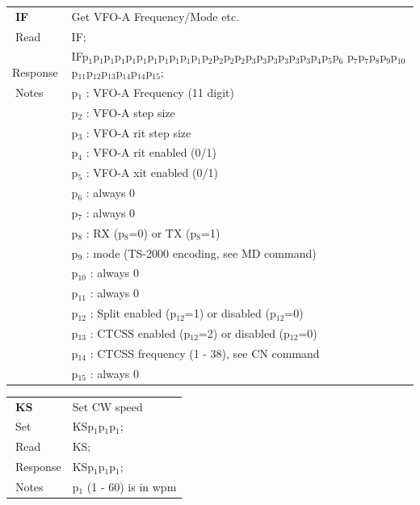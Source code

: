 \documentclass[12pt]{book}
\begin{document}
\begin{center}
\begin{tabular}{|p{2cm}|p{11cm}|}
\toprule
$\phantom{\Big|}$\textbf{\large IF} & Get VFO-A Frequency/Mode etc. \\\cline{1-2}
$\phantom{\Big|}${\large Read} & {IF;} \\\hline
$\phantom{\Big|}${\large Response} & {IFp$_1$p$_1$p$_1$p$_1$p$_1$p$_1$p$_1$p$_1$p$_1$p$_1$p$_1$p$_2$p$_2$p$_2$p$_2$p$_3$p$_3$p$_3$p$_3$p$_3$p$_3$p$_4$p$_5$p$_6$
p$_7$p$_7$p$_8$p$_9$p$_{10}$p$_{11}$p$_{12}$p$_{13}$p$_{14}$p$_{14}$p$_{15}$;} \\\hline
$\phantom{\Big|}${\large Notes} & \multicolumn{1}{|p{11cm}|}{p$_1$ : VFO-A Frequency (11 digit)} \\
 & \multicolumn{1}{|p{11cm}|}{p$_2$ : VFO-A step size} \\
 & \multicolumn{1}{|p{11cm}|}{p$_3$ : VFO-A rit step size} \\
 & \multicolumn{1}{|p{11cm}|}{p$_4$ : VFO-A rit enabled (0/1)} \\
 & \multicolumn{1}{|p{11cm}|}{p$_5$ : VFO-A xit enabled (0/1)} \\
 & \multicolumn{1}{|p{11cm}|}{p$_6$ : always 0} \\
 & \multicolumn{1}{|p{11cm}|}{p$_7$ : always 0} \\
 & \multicolumn{1}{|p{11cm}|}{p$_8$ : RX (p$_8$=0) or TX (p$_8$=1)} \\
 & \multicolumn{1}{|p{11cm}|}{p$_9$ : mode (TS-2000 encoding, see MD command)} \\
 & \multicolumn{1}{|p{11cm}|}{p$_{10}$ : always 0} \\
 & \multicolumn{1}{|p{11cm}|}{p$_{11}$ : always 0} \\
 & \multicolumn{1}{|p{11cm}|}{p$_{12}$ : Split enabled (p$_{12}$=1) or disabled (p$_{12}$=0)} \\
 & \multicolumn{1}{|p{11cm}|}{p$_{13}$ : CTCSS enabled (p$_{12}$=2) or disabled (p$_{12}$=0)} \\
 & \multicolumn{1}{|p{11cm}|}{p$_{14}$ : CTCSS frequency (1 - 38), see CN command} \\
 & \multicolumn{1}{|p{11cm}|}{p$_{15}$ : always 0} \\
\bottomrule
\end{tabular}
\end{center}

\begin{center}
\begin{tabular}{|p{2cm}|p{11cm}|}
\toprule
$\phantom{\Big|}$\textbf{\large KS} & Set CW speed \\\cline{1-2}
$\phantom{\Big|}${\large Set} & {KSp$_1$p$_1$p$_1$;} \\\hline
$\phantom{\Big|}${\large Read} & {KS;} \\\hline
$\phantom{\Big|}${\large Response} & {KSp$_1$p$_1$p$_1$;} \\\hline
$\phantom{\Big|}${\large Notes} & \multicolumn{1}{|p{11cm}|}{p$_1$ (1 - 60) is in wpm} \\
\bottomrule
\end{tabular}
\end{center}
\end{document}
